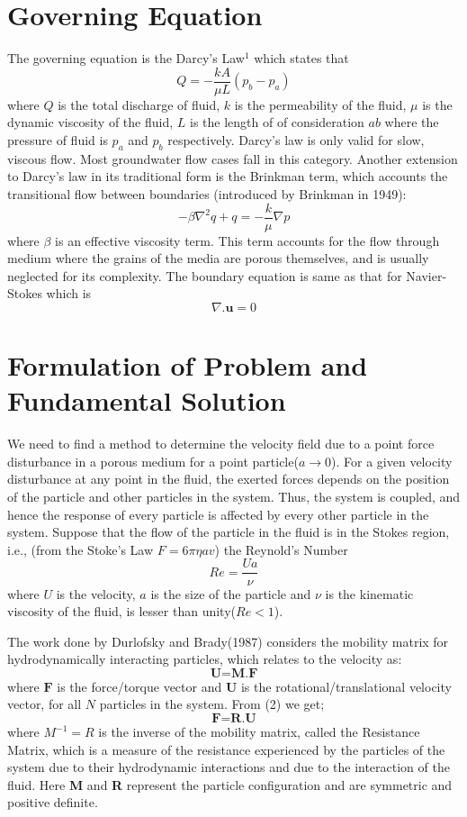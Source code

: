 \documentclass[12pt]{article}
\begin{document}
\section{Governing Equation}
The governing equation is the Darcy's Law$^1$ which states that $$Q=-\frac{kA}{\mu L}\left({p_{b}-p_{a}}\right)$$ where $Q$ is the total discharge of fluid, $k$ is the permeability of the fluid, $\mu$ is the dynamic viscosity of the fluid, $L$ is the length of of consideration $ab$ where the pressure of fluid is $p_{a}$ and $p_{b}$ respectively. Darcy's law is only valid for slow, viscous flow. Most groundwater flow cases fall in this category. Another extension to Darcy's law in its traditional form is the Brinkman term, which accounts the transitional flow between boundaries (introduced by Brinkman in 1949): $$-\beta\nabla^2 q + q = -\frac{k}{\mu}\nabla p$$ where $\beta$ is an effective viscosity term. This term accounts for the flow through medium where the grains of the media are porous themselves, and is usually neglected for its complexity.
The boundary equation is same as that for Navier-Stokes which is $$\nabla.\textbf{u}=0$$ 


\section{Formulation of Problem and Fundamental Solution}
We need to find a method to determine the velocity field due to a point force disturbance in a porous medium for a point particle($a\rightarrow 0$).  For a given velocity disturbance at any point in the fluid, the exerted forces depends on the position of the particle and other particles in the system. Thus, the system is coupled, and hence the response of every particle is affected by every other particle in the system. Suppose that the flow of the particle in the fluid is in the Stokes region, i.e., (from the Stoke's Law $F=6\pi\eta a v$) the Reynold's Number $$Re=\frac{Ua}{\nu}$$ where $U$ is the velocity, $a$ is the size of the particle and $\nu$ is the kinematic viscosity of the fluid, is lesser than unity($Re<1$).

The work done by Durlofsky and Brady(1987) considers the mobility matrix for hydrodynamically interacting particles, which relates to the velocity as: \begin{equation} \label{eq2}
\textbf{U=M.F}
\end{equation} where $\textbf{F}$ is the force/torque vector and $\textbf{U}$ is the rotational/translational velocity vector, for all $N$ particles in the system. From (2) we get; 
\begin{equation} \label{eq3}
\textbf{F=R.U}
\end{equation} where \textbf{$M^{-1}=R$} is the inverse of the mobility matrix, called the Resistance Matrix, which is a measure of the resistance experienced by the particles of the system due to their hydrodynamic interactions and due to the interaction of the fluid. Here \textbf{M} and \textbf{R} represent the particle configuration and are symmetric and positive definite.
\end{document}
